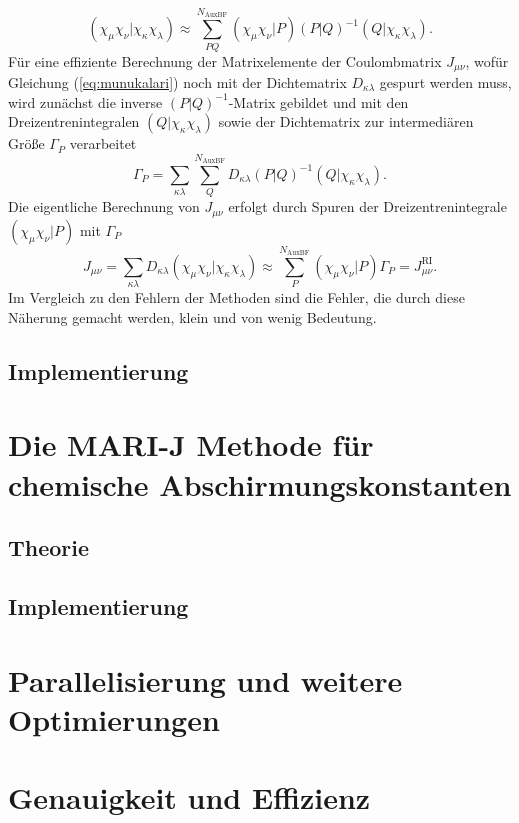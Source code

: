 	\begin{equation}\label{eq:munukalari}
	\left(\chi_\mu\chi_\nu\vert\chi_\kappa\chi_\lambda\right)\approx\sum_{PQ}^{N_{\textrm{AuxBF}}}\left(\chi_\mu\chi_\nu\vert P\right)\left(P\vert Q\right)^{-1}\left(Q\vert\chi_\kappa\chi_\lambda\right).		
	\end{equation}
	Für eine effiziente Berechnung der Matrixelemente der Coulombmatrix $J_{\mu\nu}$, wofür Gleichung (\ref{eq:munukalari}) noch mit der Dichtematrix $D_{\kappa\lambda}$ gespurt werden muss, wird zunächst die inverse $\left(P\vert Q\right)^{-1}$-Matrix gebildet und mit den Dreizentrenintegralen $\left(Q\vert\chi_\kappa\chi_\lambda\right)$ sowie der Dichtematrix zur intermediären Größe $\Gamma_P$ verarbeitet
	\begin{equation}
	\Gamma_P=\sum_{\kappa\lambda}\sum_Q^{N_{\textrm{AuxBF}}} D_{\kappa\lambda}\left(P\vert Q\right)^{-1}\left(Q\vert\chi_\kappa\chi_\lambda\right).
	\end{equation}
	Die eigentliche Berechnung von $J_{\mu\nu}$ erfolgt durch Spuren der Dreizentrenintegrale $\left(\chi_\mu\chi_\nu\vert P\right)$ mit $\Gamma_P$
	\begin{equation}
	J_{\mu\nu}=\sum_{\kappa\lambda}D_{\kappa\lambda}\left(\chi_\mu\chi_\nu\vert\chi_\kappa\chi_\lambda\right)\approx\sum_{P}^{N_{\textrm{AuxBF}}}\left(\chi_\mu\chi_\nu\vert P\right)\Gamma_P=J_{\mu\nu}^{\textrm{RI}}.
	\end{equation}
	Im Vergleich zu den Fehlern der Methoden sind die Fehler, die durch diese Näherung gemacht werden, klein und von wenig Bedeutung.\supercite{eichkorn1995auxiliary}
	\subsection{Implementierung}

\section{Die MARI-J Methode für chemische Abschirmungskonstanten}\label{marij}
	\subsection{Theorie}
	\subsection{Implementierung}
	
\section{Parallelisierung und weitere Optimierungen}\label{paraopt}

\section{Genauigkeit und Effizienz}\label{genauigkeit}